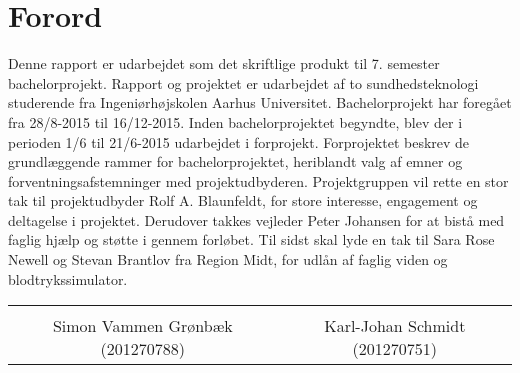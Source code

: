 \chapter*{Forord}

Denne rapport er udarbejdet som det skriftlige produkt til 7. semester bachelorprojekt. Rapport og projektet er udarbejdet af to sundhedsteknologi studerende fra Ingeniørhøjskolen Aarhus Universitet. Bachelorprojekt har foregået fra 28/8-2015 til 16/12-2015. Inden bachelorprojektet begyndte, blev der i perioden 1/6 til 21/6-2015 udarbejdet i forprojekt. Forprojektet beskrev de grundlæggende rammer for bachelorprojektet, heriblandt valg af emner og forventningsafstemninger med projektudbyderen. 
Projektgruppen vil rette en stor tak til projektudbyder Rolf A. Blaunfeldt, for store interesse, engagement og deltagelse i projektet. Derudover takkes vejleder Peter Johansen for at bistå med faglig hjælp og støtte i gennem forløbet. Til sidst skal lyde en tak til Sara Rose Newell og Stevan Brantlov fra Region Midt, for udlån af faglig viden og blodtrykssimulator. 

\vspace{3cm}

\begin{table}[H]
	\centering
	\begin{tabular}{c c}
		\underline{\phantom{mmmmmmmmmmmmmmmmmmmmm}} & \underline{\phantom{mmmmmmmmmmmmmmmmmmmmm}} \\
		Simon Vammen Grønbæk (201270788) \vspace{2cm} & Karl-Johan Schmidt (201270751) \vspace{2cm}\\
	\end{tabular}
\end{table}